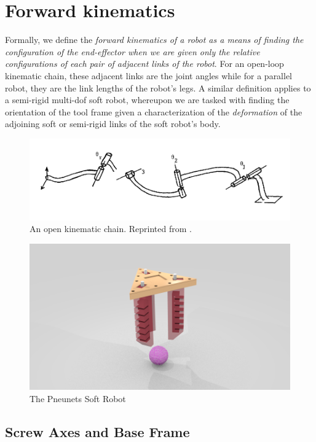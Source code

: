 \section{Forward kinematics}
%
Formally, we define the \textit{forward kinematics of a robot as a means of finding the configuration of the end-effector when we are given only the relative configurations of each pair of adjacent links of the robot}. For an open-loop kinematic chain, these adjacent links are the joint angles while for a parallel robot, they are the link lengths of the robot's legs. A similar definition applies to a semi-rigid multi-dof soft robot, whereupon we are tasked with finding the orientation of the tool frame given a characterization of the \textit{deformation} of the adjoining soft or semi-rigid links of the soft robot's body. 
%
\begin{figure}[tb!]
	\centering
	\includegraphics[width=.8\columnwidth]{figures/manip.png}
	\caption{An open kinematic chain. Reprinted from \cite{Brockett1990}.}
	\label{fig:manip}
\end{figure}
%
\begin{figure}[tb!]
	\centering
	\includegraphics[width=.8\columnwidth]{figures/pneunets.png}
	\caption{The Pneunets Soft Robot}
	\label{fig:pneunets}
\end{figure}
%

\subsection{Screw Axes and  Base Frame}

